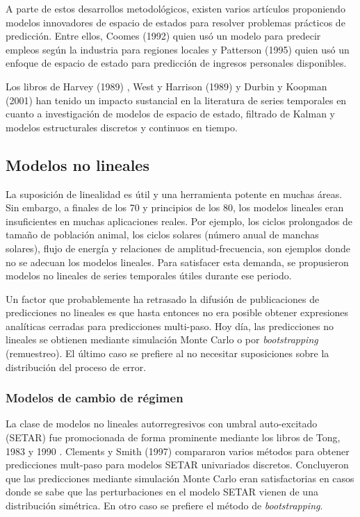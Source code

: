 \documentclass{llncs}
\begin{document}
A parte de estos desarrollos metodológicos, existen varios artículos proponiendo modelos innovadores de espacio de estados para resolver problemas prácticos de predicción. Entre ellos, Coomes (1992) \cite{Coomes1992473} quien usó un modelo para predecir empleos según la industria para regiones locales y Patterson (1995) \cite{Patterson1995395} quien usó un enfoque de espacio de estado para predicción de ingresos personales disponibles. 

Los libros de Harvey (1989) \cite{Harvey1989}, West y Harrison (1989) \cite{West1997}y Durbin y Koopman (2001) \cite{Durbin2001} han tenido un impacto sustancial en la literatura de series temporales en cuanto a investigación de modelos de espacio de estado, filtrado de Kalman y modelos estructurales discretos y continuos en tiempo. 


\subsection{Modelos no lineales}

La suposición de linealidad es útil y una herramienta potente en muchas áreas. Sin embargo, a finales de los 70 y principios de los 80, los modelos lineales eran insuficientes en muchas aplicaciones reales. Por ejemplo, los ciclos prolongados de tamaño de población animal, los ciclos solares (número anual de manchas solares), flujo de energía y relaciones de amplitud-frecuencia, son ejemplos donde no se adecuan los modelos lineales. Para satisfacer esta demanda, se propusieron modelos no lineales de series temporales útiles durante ese periodo.

Un factor que probablemente ha retrasado la difusión de publicaciones de predicciones no lineales es que hasta entonces no era posible obtener expresiones analíticas cerradas para predicciones multi-paso. Hoy día, las predicciones no lineales se obtienen mediante simulación Monte Carlo o por \emph{bootstrapping} (remuestreo). El último caso se prefiere al no necesitar suposiciones sobre la distribución del proceso de error.


\subsubsection{Modelos de cambio de régimen}
La clase de modelos no lineales autorregresivos con umbral auto-excitado (SETAR) fue promocionada de forma prominente mediante los libros de Tong, 1983  \cite{Tong1983} y 1990  \cite{Tong1990}. Clements y Smith (1997)  \cite{Clements1997463} compararon varios métodos para obtener predicciones mult-paso para modelos SETAR univariados discretos. Concluyeron que las predicciones mediante simulación Monte Carlo eran satisfactorias en casos donde se sabe que las perturbaciones en el modelo SETAR vienen de una distribución simétrica. En otro caso se prefiere el método de \emph{bootstrapping}. 
\end{document}
